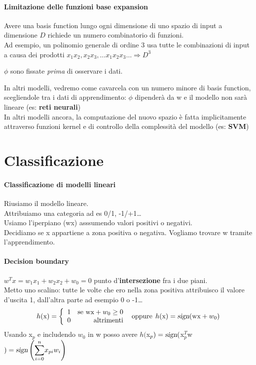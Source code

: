 \documentclass[10pt]{book}
\begin{document}
\paragraph{Limitazione delle funzioni base expansion}
\begin{list}{}{}
	\item Avere una basis function lungo ogni dimensione di uno spazio di input a dimensione $D$ richiede un numero combinatorio di funzioni.\\
	Ad esempio, un polinomio generale di ordine 3 usa tutte le combinazioni di input a causa dei prodotti $x_1x_2, x_2x_3,\ldots x_1x_2x_3\ldots \Rightarrow D^3$
	\item $\phi$ sono fissate \textit{prima} di osservare i dati.
\end{list}
In altri modelli, vedremo come cavarcela con un numero minore di basis function, scegliendole tra i dati di apprendimento: $\phi$ dipenderà da w e il modello non sarà lineare (es: \textbf{reti neurali})\\
In altri modelli ancora, la computazione del nuovo spazio è fatta implicitamente attraverso funzioni kernel e di controllo della complessità del modello (es: \textbf{SVM})
\section{Classificazione}
\paragraph{Classificazione di modelli lineari} Riusiamo il modello lineare.\\ Attribuiamo una categoria ad es 0/1, -1/+1\ldots\\
Usiamo l'iperpiano (wx) asssumendo valori positivi o negativi.\\
Decidiamo se x appartiene a zona positiva o negativa. Vogliamo trovare w tramite l'apprendimento.
\paragraph{Decision boundary} $w^T x = w_1x_1 + w_2x_2 + w_0 = 0$ punto d'\textbf{intersezione} fra i due piani.\\
Metto uno scalino: tutte le volte che ero nella zona positiva attribuisco il valore d'uscita 1, dall'altra parte ad esempio 0 o -1\ldots
$$h(\text{x}) = \left\{ \begin{array}{l r}
1 & \text{se wx} + w_0 \geq 0\\
0 & \text{altrimenti}
\end{array} \right. \:\:\text{oppure}\:\:h(\text{x}) = \textsl{sign}(\text{wx} + w_0)$$
Usando x$_p$ e includendo $w_0$ in w posso avere $h($x$_p) = \textsl{sign}($x$_p^T$w$) = \textsl{sign}\left(\mathlarger{\sum_{i=0}^n} x_{pi}w_i\right)$
\end{document}

